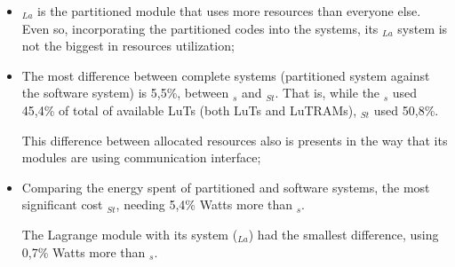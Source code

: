         \begin{itemize}
            \item 
            \A$_{La}$ is the partitioned module that uses more resources than everyone else.
            Even so, incorporating the partitioned codes into the systems, its \Ss$_{La}$ system is not the biggest in resources utilization;
            
            \item
            The most difference between complete systems (partitioned system against the software system) is 5,5\%, between \Ss$_{s}$ and \Ss$_{St}$. 
            That is, while the \Ss$_{s}$ used 45,4\% of total of available LuTs (both LuTs and LuTRAMs), \Ss$_{St}$ used 50,8\%.
            
            
            This difference between allocated resources also is presents in the way that its modules are using communication interface;
            
            \item
            Comparing the energy spent of partitioned and software systems, the most significant cost \Ss$_{St}$, needing 5,4\% Watts more than \Ss$_{s}$.
            
            The Lagrange module with its system (\Ss$_{La}$) had the smallest difference, using 0,7\% Watts more than \Ss$ _s $.
        \end{itemize}
           
